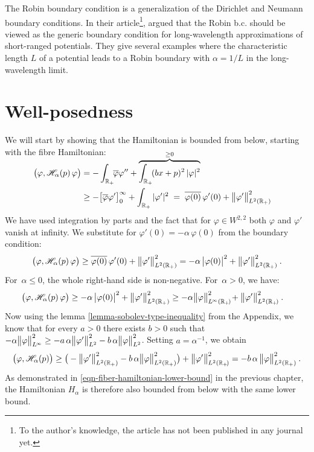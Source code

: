 \medskip

The Robin boundary condition is a generalization of the Dirichlet and Neumann boundary conditions. In their article\footnote{To the author's knowledge, the article has not been published in any journal yet.}, \citet{Allwright2016} argued that the Robin b.c. should be viewed as the generic boundary condition for long-wavelength approximations of short-ranged potentials. They give several examples where the characteristic length $L$ of a potential leads to a Robin boundary with $\alpha = 1/L$ in the long-wavelength limit.


\section{Well-posedness}
We will start by showing that the Hamiltonian is bounded from below, starting with the fibre Hamiltonian:
\begin{align*}
    \\[-2\baselineskip]
    \big( \varphi, \mathscr{H}_\alpha(p) \, \varphi \big)
    &= - \int_{\mathbb{R}_+} \!\! \overline\varphi \varphi''
    + \overbrace{\int_{\mathbb{R}_+} \! (bx + p)^2 \, |\varphi|^2}^{\geq 0}
    \\
    &\geq -\big[ \overline\varphi \varphi' \big]_0^{\infty}
    + \int_{\mathbb{R}_+} |\varphi'|^2
    \;=\;
    \overline{ \varphi(0) } \, \varphi'(0)
    + \big\lVert  \varphi'  \big\rVert_{L^2(\mathbb{R}_+)}^2
\end{align*}
We have used integration by parts and the fact that for $\varphi \in W^{2,2}$ both $\varphi$ and $\varphi'$ vanish at infinity. We substitute for $\varphi'(0) = -\alpha \, \varphi(0)$ from the boundary condition:
\begin{align*}
    \big( \varphi, \mathscr{H}_\alpha(p) \, \varphi \big)
    \geq \overline{ \varphi(0) } \, \varphi'(0)
    + \big\lVert  \varphi'  \big\rVert_{L^2(\mathbb{R}_+)}^2
    = - \alpha \, \big| \varphi(0) \big|^2
    + \big\lVert  \varphi'  \big\rVert_{L^2(\mathbb{R}_+)}^2
    \: .
\end{align*}
For~$\alpha \leq 0$, the whole right-hand side is non-negative. For~$\alpha > 0$, we have:
\begin{align*}
    &\big( \varphi, \mathscr{H}_\alpha(p) \, \varphi \big)
    \geq - \alpha \, \big| \varphi(0) \big|^2
    + \big\lVert  \varphi'  \big\rVert_{L^2(\mathbb{R}_+)}^2
    \geq -\alpha \big\lVert \varphi \big\rVert_{L^{\!\infty}(\mathbb{R}_+\!)}^2
    \! + \big\lVert  \varphi'  \big\rVert_{L^2(\mathbb{R}_+\!)}^2
    \: .
\end{align*}
Now using the lemma \ref{lemma-sobolev-type-inequality} from the Appendix, we know that for every $a>0$ there exists $b>0$ such that $-\alpha \big\lVert \varphi \big\rVert_{L^{\!\infty}}^2 \geq -a \, \alpha \big\lVert \varphi' \big\rVert_{L^2}^2 - b \, \alpha \big\lVert \varphi \big\rVert_{L^2}^2$. Setting $a = \alpha^{-1}$, we obtain
\begin{equation*}
    \big( \varphi, \mathscr{H}_\alpha(p) \big)
    \geq \big(
        -\big\lVert \varphi' \big\rVert_{L^2(\mathbb{R}_+)}^2
        - b \, \alpha \big\lVert \varphi \big\rVert_{L^2(\mathbb{R}_+)}^2
    \big)
     + \big\lVert  \varphi'  \big\rVert_{L^2(\mathbb{R}_+\!)}^2
    =
    - b \, \alpha \,
    \big\lVert \varphi \big\rVert_{L^2(\mathbb{R}_+)}^2
    \: .
\end{equation*}
As demonstrated in \eqref{eqn-fiber-hamiltonian-lower-bound} in the previous chapter, the Hamiltonian $H_\alpha$ is therefore also bounded from below with the same lower bound.


